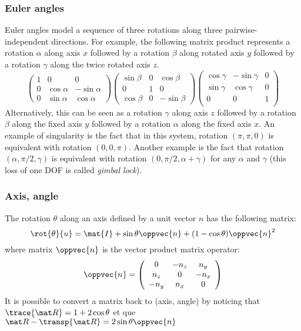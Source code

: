 \subsubsection{Euler angles}
Euler angles model a sequence of three rotations along three pairwise-independent directions. For example, the following matrix product represents a rotation $\alpha$ along axis $x$ followed by a rotation $\beta$ along rotated axis $y$ followed by a rotation $\gamma$ along the twice rotated axis $z$.
$$
\left(\begin{array}{ccc}
1 & 0 & 0 \\
0 & \cos\alpha & -\sin\alpha \\
0 & \sin\alpha &  \cos\alpha
\end{array}\right)
\left(\begin{array}{ccc}
\sin\beta & 0 &  \cos\beta\\
0 & 1 & 0 \\
\cos\beta & 0 & -\sin\beta
\end{array}\right)
\left(\begin{array}{ccc}
\cos\gamma & -\sin\gamma & 0\\
\sin\gamma & \cos\gamma & 0\\
0 & 0 & 1\\
\end{array}\right)
$$
Alternatively, this can be seen as a rotation  $\gamma$ along axis $z$ followed by a rotation $\beta$ along the fixed axis $y$ followed by a rotation $\alpha$ along the fixed axis $x$. An example of singularity is the fact that in this system, rotation $(\pi,\pi,0)$ is equivalent with rotation $(0,0,\pi)$. Another example is the fact that rotation $(\alpha,\pi /2, \gamma)$ is equivalent with rotation $(0,\pi /2, \alpha+\gamma)$ for any $\alpha$ and $\gamma$ (this loss of one DOF is called \emph{gimbal lock}).

\subsubsection{Axis, angle}
The rotation $\theta$ along an axis defined by a unit vector $n$ has the following matrix:
$$
\rot{\theta}{u} = \mat{I} + \sin\theta\oppvec{n} + (1-\cos\theta)\oppvec{n}^2
$$
where matrix $\oppvec{n}$  is the vector product matrix operator: 
$$
\oppvec{n} = \left(\begin{array}{ccc}
0 & -n_z & n_y \\
n_z & 0 & -n_x \\
-n_y & n_x & 0
\end{array}\right)
$$
It is possible to convert a matrix back to (axis, angle) by noticing that  $\trace{\mat R}=1+2\cos\theta$ et que $\mat R -\transp{\mat R} = 2\sin\theta\oppvec{n}$

